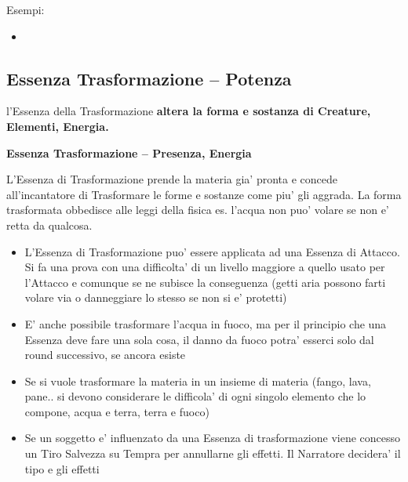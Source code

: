 \documentclass[a4paper,11pt,twoside,openany]{dndbook}
\begin{document}
\bigskip

Esempi:
\begin{itemize}
\item 
{}
\end{itemize}

\pagebreak


\subsection{Essenza Trasformazione -- Potenza}

\label{essenza-trasformazione---potenza}

l'Essenza della Trasformazione \textbf{altera la forma e sostanza di Creature, Elementi, Energia.}

\bigskip

\textbf{Essenza Trasformazione -- Presenza, Energia}

L'Essenza di Trasformazione prende la materia gia' pronta e concede all'incantatore di Trasformare le forme e sostanze come piu' gli aggrada. La forma trasformata obbedisce alle leggi della fisica es. l'acqua non puo' volare se non e' retta da qualcosa.

\begin{itemize}
\item 
L'Essenza di Trasformazione puo' essere applicata ad una Essenza di Attacco. Si fa una prova con una difficolta' di un livello maggiore a quello usato per l'Attacco e comunque se ne subisce la conseguenza (getti aria possono farti volare via o danneggiare lo stesso se non si e' protetti) 
\item 
E' anche possibile trasformare l'acqua in fuoco, ma per il principio che una Essenza deve fare una sola cosa, il danno da fuoco potra' esserci solo dal round successivo, se ancora esiste 
\item 
Se si vuole trasformare la materia in un insieme di materia (fango, lava, pane.. si devono considerare le difficola' di ogni singolo elemento che lo compone, acqua e terra, terra e fuoco) 
\item 
Se un soggetto e' influenzato da una Essenza di trasformazione viene concesso un Tiro Salvezza su Tempra per annullarne gli effetti. Il Narratore decidera' il tipo e gli effetti 
\end{itemize}
\end{document}
